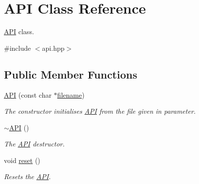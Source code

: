 \hypertarget{classAPI}{}\section{A\+P\+I Class Reference}
\label{classAPI}


\hyperlink{classAPI}{A\+P\+I} class.  




{\ttfamily \#include $<$api.\+hpp$>$}

\subsection*{Public Member Functions}
\begin{DoxyCompactItemize}
\item 
\hyperlink{classAPI_ad2a474485b3635f22fe4f80a09370ed6}{A\+P\+I} (const char $\ast$\hyperlink{classAPI_aa4e36aeea94c8fae7fe0b2a2db58d06b}{filename})
\begin{DoxyCompactList}\small\item\em The constructor initialises \hyperlink{classAPI}{A\+P\+I} from the file given in parameter. \end{DoxyCompactList}\item 
\hyperlink{classAPI_a583ec65b542b44e4b7013f5fc830fdcd}{$\sim$\+A\+P\+I} ()
\begin{DoxyCompactList}\small\item\em The \hyperlink{classAPI}{A\+P\+I} destructor. \end{DoxyCompactList}\item 
void \hyperlink{classAPI_a1a705f7e87f72e3cd8c078f438fac948}{reset} ()
\begin{DoxyCompactList}\small\item\em Resets the \hyperlink{classAPI}{A\+P\+I}. \end{DoxyCompactList}\end{DoxyCompactItemize}
